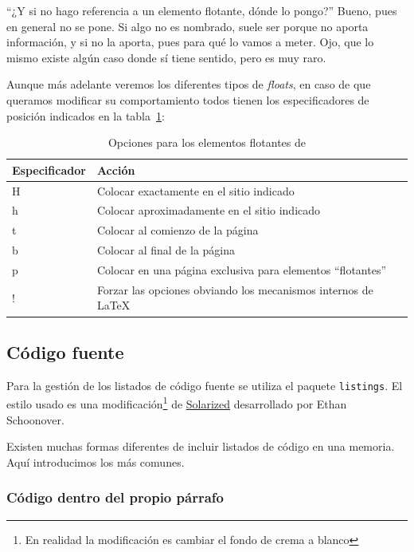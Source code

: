 \documentclass[%
    school=etsisi,%
    type=tfg,%
    degree=61CD,%
]{upm-report}
\begin{document}
\enquote{¿Y si no hago referencia a un elemento flotante, dónde lo pongo?} Bueno, pues en general no se pone. Si algo no es nombrado, suele ser porque no aporta información, y si no la aporta, pues para qué lo vamos a meter. Ojo, que lo mismo existe algún caso donde sí tiene sentido, pero es muy raro.

Aunque más adelante veremos los diferentes tipos de \textit{floats}, en caso de que queramos modificar su comportamiento todos tienen los especificadores de posición indicados en la tabla~\ref{tab:floats-options}:

\begin{table}
    \caption{\label{tab:floats-options}Opciones para los elementos flotantes de }
    \centering
    \begin{tabularx}{\textwidth}{@{}lX@{}}
        \toprule
        \textbf{Especificador} & \textbf{Acción} \\
        \midrule
        H & Colocar exactamente en el sitio indicado                       \\
        h & Colocar aproximadamente en el sitio indicado                   \\
        t & Colocar al comienzo de la página                               \\
        b & Colocar al final de la página                                  \\
        p & Colocar en una página exclusiva para elementos ``flotantes''   \\
        ! & Forzar las opciones obviando los mecanismos internos de \LaTeX \\
    \bottomrule
    \end{tabularx}
\end{table}

\subsection{Código fuente}

Para la gestión de los listados de código fuente se utiliza el paquete \texttt{listings}. El estilo usado es una modificación\footnote{En realidad la modificación es cambiar el fondo de crema a blanco} de \href{https://ethanschoonover.com/solarized/}{Solarized} desarrollado por Ethan Schoonover.

Existen muchas formas diferentes de incluir listados de código en una memoria. Aquí introducimos los más comunes.

\subsubsection{Código dentro del propio párrafo}
\end{document}
